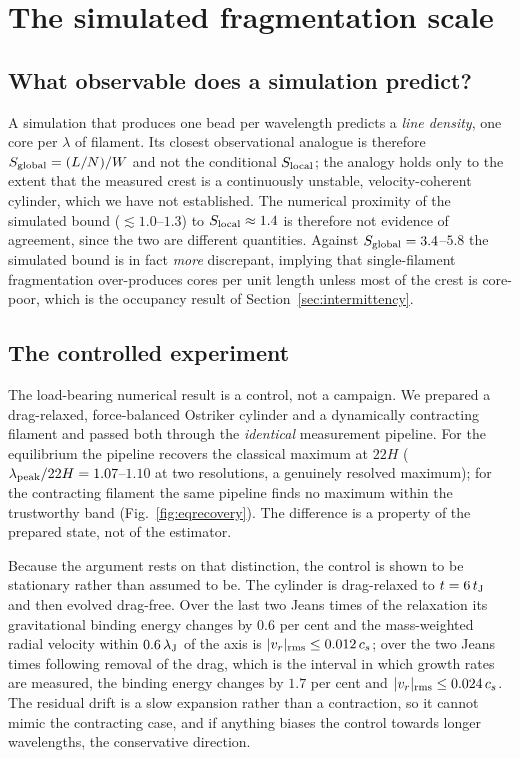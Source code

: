 \documentclass[usenatbib,twoside,twocolumn]{mnras}
\begin{document}
\section{The simulated fragmentation scale}
\label{sec:validation_endtoend}

\subsection{What observable does a simulation predict?}
\label{sec:whatobservable}

A simulation that produces one bead per wavelength predicts a \emph{line density}, one core per $\lambda$ of filament. Its closest observational analogue is therefore $S_{\rm global}=(L/N)/W$ and not the conditional $S_{\rm local}$; the analogy holds only to the extent that the measured crest is a continuously unstable, velocity-coherent cylinder, which we have not established. The numerical proximity of the simulated bound ($\lesssim1.0$--$1.3$) to $S_{\rm local}\approx1.4$ is therefore not evidence of agreement, since the two are different quantities. Against $S_{\rm global}=3.4$--$5.8$ the simulated bound is in fact \emph{more} discrepant, implying that single-filament fragmentation over-produces cores per unit length unless most of the crest is core-poor, which is the occupancy result of Section~\ref{sec:intermittency}.

\subsection{The controlled experiment}
\label{sec:control}

The load-bearing numerical result is a control, not a campaign. We prepared a drag-relaxed, force-balanced Ostriker cylinder and a dynamically contracting filament and passed both through the \emph{identical} measurement pipeline. For the equilibrium the pipeline recovers the classical maximum at $22H$ ($\lambda_{\rm peak}/22H=1.07$--$1.10$ at two resolutions, a genuinely resolved maximum); for the contracting filament the same pipeline finds no maximum within the trustworthy band (Fig.~\ref{fig:eqrecovery}). The difference is a property of the prepared state, not of the estimator.

Because the argument rests on that distinction, the control is shown to be stationary rather than assumed to be. The cylinder is drag-relaxed to $t=6\,t_{\rm J}$ and then evolved drag-free. Over the last two Jeans times of the relaxation its gravitational binding energy changes by $0.6$ per cent and the mass-weighted radial velocity within $0.6\,\lambda_{\rm J}$ of the axis is $|v_r|_{\rm rms}\leq0.012\,c_s$; over the two Jeans times following removal of the drag, which is the interval in which growth rates are measured, the binding energy changes by $1.7$ per cent and $|v_r|_{\rm rms}\leq0.024\,c_s$. The residual drift is a slow expansion rather than a contraction, so it cannot mimic the contracting case, and if anything biases the control towards longer wavelengths, the conservative direction.
\end{document}
